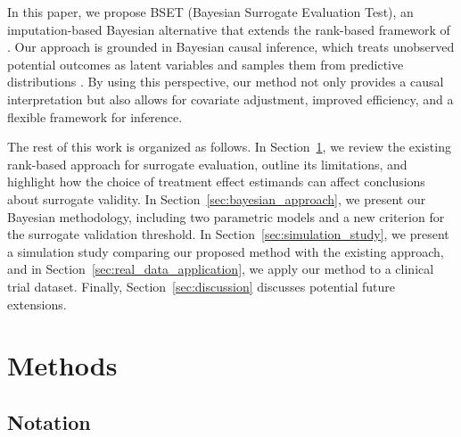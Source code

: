 \documentclass[referee,usenatbib]{biom}
\begin{document}
In this paper, we propose BSET (Bayesian Surrogate Evaluation Test), an imputation-based Bayesian alternative that extends the rank-based framework of \citet{parast2024rank}. Our approach is grounded in Bayesian causal inference, which treats unobserved potential outcomes as latent variables and samples them from predictive distributions \citep{li2023bayesian}. By using this perspective, our method not only provides a causal interpretation but also allows for covariate adjustment, improved efficiency, and a flexible framework for inference.

The rest of this work is organized as follows. In Section~\ref{sec:methods}, we review the existing rank-based approach for surrogate evaluation, outline its limitations, and highlight how the choice of treatment effect estimands can affect conclusions about surrogate validity. In Section~\ref{sec:bayesian_approach}, we present our Bayesian methodology, including two parametric models and a new criterion for the surrogate validation threshold. In Section~\ref{sec:simulation_study}, we present a simulation study comparing our proposed method with the existing approach, and in Section~\ref{sec:real_data_application}, we apply our method to a clinical trial dataset. Finally, Section~\ref{sec:discussion} discusses potential future extensions.

\section{Methods}\label{sec:methods}

\subsection{Notation}\label{subsec:notation}
\end{document}

